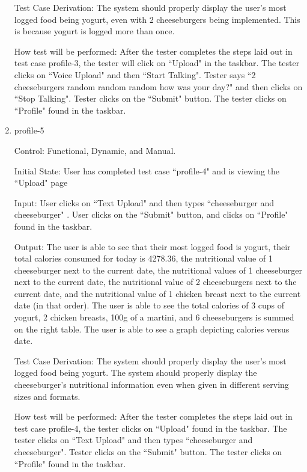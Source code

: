 \documentclass[12pt, titlepage]{article}
\begin{document}
\begin{enumerate}
		Test Case Derivation: The system should properly display the user's most logged food being yogurt, even with 2 cheeseburgers being implemented. This is because yogurt is logged more than once.
		
		How test will be performed: After the tester completes the steps laid out in test case profile-3, the tester will click on ``Upload" in the taskbar. The tester clicks on ``Voice Upload" and then ``Start Talking". Tester says ``2 cheeseburgers random random random how was your day?" and then clicks on ``Stop Talking". Tester clicks on the ``Submit" button. The tester clicks on ``Profile" found in the taskbar.
		
		\item{profile-5\\}
		
		Control: Functional, Dynamic, and Manual.
		
		Initial State: User has completed test case ``profile-4" and is viewing the ``Upload" page
		
		Input: User clicks on ``Text Upload" and then types ``cheeseburger and cheeseburger" . User clicks on the ``Submit" button, and clicks on ``Profile" found in the taskbar.
		
		Output: The user is able to see that their most logged food is yogurt, their total calories consumed for today is 4278.36, the nutritional value of 1 cheeseburger next to the current date, the nutritional values of 1 cheeseburger next to the current date, the nutritional value of 2 cheeseburgers next to the current date, and the nutritional value of 1 chicken breast next to the current date (in that order). The user is able to see the total calories of 3 cups of yogurt, 2 chicken breasts, 100g of a martini, and 6 cheeseburgers is summed on the right table. The user is able to see a graph depicting calories versus date.
		
		Test Case Derivation: The system should properly display the user's most logged food being yogurt. The system should properly display the cheeseburger's nutritional information even when given in different serving sizes and formats.
		
		How test will be performed: After the tester completes the steps laid out in test case profile-4, the tester clicks on ``Upload" found in the taskbar. The tester clicks on ``Text Upload" and then types ``cheeseburger and cheeseburger". Tester clicks on the ``Submit" button. The tester clicks on ``Profile" found in the taskbar.
		

\end{enumerate}
\end{document}
